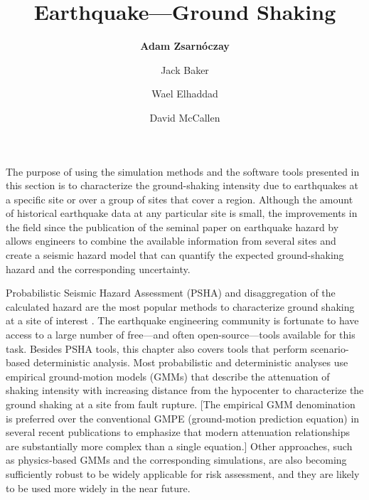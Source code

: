 %
%
%

\title{Earthquake---Ground Shaking}
\label{chp:eq_shaking}
\author{
    \textbf{Adam Zsarnóczay}
    \and Jack Baker 
    \and Wael Elhaddad
    \and David McCallen}
\tocauthor{}
%
%
\maketitle
\label{chapter:haz_shaking}

The purpose of using the simulation methods and the software tools presented in this section is to characterize the ground-shaking intensity due to earthquakes at a specific site or over a group of sites that cover a region. Although the amount of historical earthquake data at any particular site is small, the improvements in the field since the publication of the seminal paper on earthquake hazard by \citet{cornell1968engineering} allows engineers to combine the available information from several sites and create a seismic hazard model that can quantify the expected ground-shaking hazard and the corresponding uncertainty. 

Probabilistic Seismic Hazard Assessment (PSHA) and disaggregation of the calculated hazard are the most popular methods to characterize ground shaking at a site of interest \citep{bazzurro1999disaggregation}. The earthquake engineering community is fortunate to have access to a large number of free---and often open-source---tools available for this task. Besides PSHA tools, this chapter also covers tools that perform scenario-based deterministic analysis. Most probabilistic and deterministic analyses use empirical ground-motion models (GMMs) that describe the attenuation of shaking intensity with increasing distance from the hypocenter to characterize the ground shaking at a site from fault rupture. [The empirical GMM denomination is preferred over the conventional GMPE (ground-motion prediction equation) in several recent publications to emphasize that modern attenuation relationships are substantially more complex than a single equation.] Other approaches, such as physics-based GMMs and the corresponding simulations, are also becoming sufficiently robust to be widely applicable for risk assessment, and they are likely to be used more widely in the near future. 

